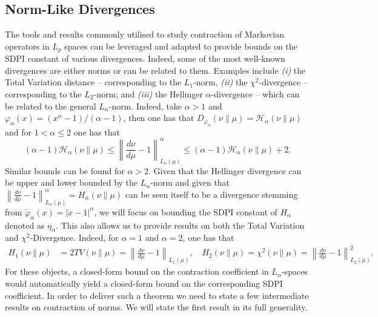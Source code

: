 \documentclass[11pt]{article}
\theoremstyle{plain}
\theoremstyle{remark}
\begin{document}
\subsection{Norm-Like Divergences}\label{sec:sdpiBound}


The tools and results commonly utilised to study contraction of Markovian operators in $L_p$ spaces can be leveraged and adapted to provide bounds on the SDPI constant of various divergences. Indeed, some of the most well-known divergences are either norms or can be related to them. Examples include \emph{(i)} the Total Variation distance -- corresponding to the $L_1$-norm, \emph{(ii)} the $\chi^2$-divergence -- corresponding to the $L_2$-norm; and \emph{(iii)} the Hellinger $\alpha$-divergence -- which can be related to the general $L_\alpha$-norm. %
Indeed, take $\alpha>1$ and $\varphi_\alpha(x)= (x^\alpha-1)/(\alpha-1)$, then one has that $D_{\varphi_\alpha}(\nu\|\mu) = \mathcal{H}_\alpha(\nu\|\mu)$ and for $1<\alpha \leq 2$ one has that
\begin{equation}
    (\alpha-1)\mathcal{H}_\alpha(\nu\|\mu) \leq \left\lVert \frac{d\nu}{d\mu}-1\right\rVert_{L_\alpha(\mu)}^\alpha \leq (\alpha-1)\mathcal{H}_\alpha(\nu\|\mu)+2.
\end{equation}
Similar bounds can be found for $\alpha>2$.
Given that the Hellinger divergence can be upper and lower bounded by the $L_\alpha$-norm and given that $\left\lVert \frac{d\nu}{d\mu}-1 \right\rVert_{L_\alpha(\mu)}^\alpha = H_\alpha(\nu\|\mu)$ can be seen itself to be a divergence stemming from $\tilde{\varphi}_\alpha(x)= |x-1|^\alpha$, we will focus on bounding the SDPI constant of $H_\alpha$ denoted as $\eta_{\alpha}$. This also allows us to provide results on both the Total Variation and $\chi^2$-Divergence. 
Indeed, for $\alpha=1$ and $\alpha=2$, one has that
\begin{align}
H_1(\nu\|\mu) &= 2TV(\nu\|\mu) = \left\lVert \frac{d\nu}{d\mu}-1\right\rVert_{L_1(\mu)}, \quad %
    H_2(\nu\|\mu) = \chi^2(\nu\|\mu) = \left\lVert \frac{d\nu}{d\mu}-1\right\rVert_{L_2(\mu)}^2.
\end{align}
For these objects, a closed-form bound on the contraction coefficient in $L_\alpha$-spaces would automatically yield a closed-form bound on the corresponding SDPI coefficient. In order to deliver such a theorem we need to state a few intermediate results on contraction of norms. We will state the first result in its full generality.
\end{document}
